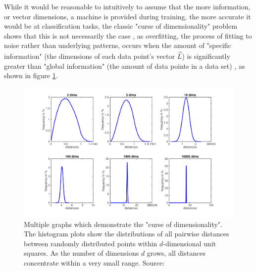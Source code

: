 While it would be reasonable to intuitively to assume that the more information, or vector dimensions, a machine is provided during training, the more accurate it would be at classification tasks, the classic "curse of dimensionality" problem shows that this is not necessarily the case \cite{jain_1982_39} \cite{friedman_1997_on}, as overfitting, the process of fitting to noise rather than underlying patterns, \cite{overfitting} occurs when the amount of "specific information" (the dimensions of each data point's vector $\vec{L}$) is significantly greater than "global information" (the amount of data points in a data set) \cite{overfitting} \cite{liu_2016_overfitting}, as shown in figure \ref{fig:curse_dim}. 

\begin{figure}
    \centering
    \includegraphics[width=\linewidth]{images/cursefigure.png}
    \caption{Multiple graphs which demonstrate the "curse of dimensionality". The histogram plots show the distributions of all pairwise distances between randomly distributed points within $d$-dimensional unit squares. As the number of dimensions $d$ grows, all distances concentrate within a very small range. Source: \cite{cornell_curse_notes}
}
    \label{fig:curse_dim}
\end{figure}


